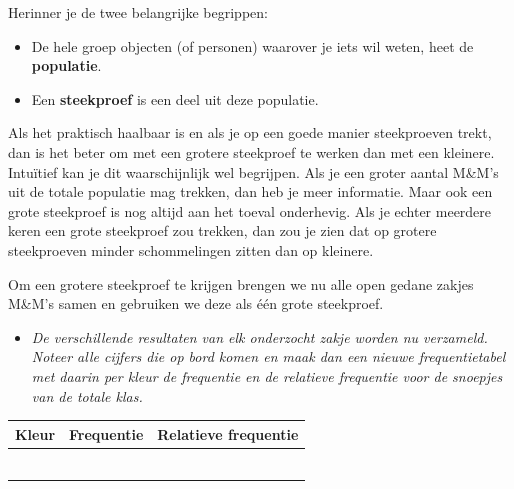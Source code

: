 \documentclass[11pt]{article}
\newcommand{\vraag}[2]{\begin{itemize}\item {\it #1} \vspace*{#2}\end{itemize}}
\begin{document}
Herinner je de twee belangrijke begrippen:
\begin{itemize}
  \item De hele groep objecten (of personen) waarover je iets wil weten, heet de {\bf populatie}.
  \item Een {\bf steekproef} is een deel uit deze populatie.
\end{itemize}

Als het praktisch haalbaar is en als je op een goede manier steekproeven trekt, dan is het beter om
met een grotere steekproef te werken dan met een kleinere. Intuïtief kan je dit waarschijnlijk wel
begrijpen. Als je een groter aantal M\&M’s uit de totale populatie mag trekken, dan heb je meer
informatie. Maar ook een grote steekproef is nog altijd aan het toeval onderhevig. Als je echter
meerdere keren een grote steekproef zou trekken, dan zou je zien dat op grotere steekproeven minder
schommelingen zitten dan op kleinere.

Om een grotere steekproef te krijgen brengen we nu alle open gedane zakjes M\&M's samen en gebruiken
we deze als één grote steekproef.

\vraag{De verschillende resultaten van elk onderzocht zakje worden nu verzameld. Noteer alle
cijfers die op bord komen en maak dan een nieuwe frequentietabel met daarin per kleur de
frequentie en de relatieve frequentie voor de snoepjes van de totale klas.}{0cm}

\begin{center}
  \begin{tabular}{|p{2cm}|p{2cm}|p{2cm}|}
    \hline
    Kleur&Frequentie&Relatieve frequentie\\
    \hline
    &&\vspace*{0pt}\\
    \hline
    &&\vspace*{0pt}\\
    \hline
    &&\vspace*{0pt}\\
    \hline
    &&\vspace*{0pt}\\
    \hline
    &&\vspace*{0pt}\\
    \hline
    &&\vspace*{0pt}\\
    \hline
  \end{tabular}
\end{center}
\vspace{1cm}
\end{document}

